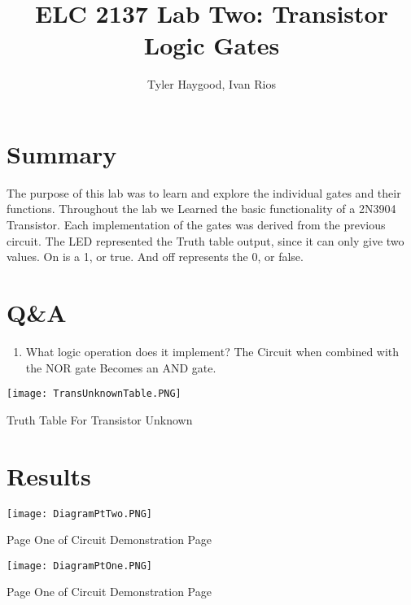 \documentclass[]{report}
\begin{document}
	
	\title{ELC 2137 Lab Two: Transistor Logic Gates}
	\author{Tyler Haygood, Ivan Rios}
	\maketitle
	
	\section*{Summary}
	
		The purpose of this lab was to learn and explore the individual gates and their functions. 
		Throughout the lab we Learned the basic functionality of a 2N3904 Transistor. Each implementation 
		of the gates was derived from the previous circuit. The LED represented the Truth table output, since it can only give two values.
		On is a 1, or true. And off represents the 0, or false.
		
	
	\section*{Q\&A}
	
		\begin{enumerate}
			\item What logic operation does it implement? \newline
			The Circuit when combined with the NOR gate Becomes an AND gate.		
		\end{enumerate}
		\centering
		\texttt{[image: TransUnknownTable.PNG]}
		\caption{Truth Table For Transistor Unknown}
		\label{fig:Trans_Unknown}
		
	\section*{Results}
	
		\centering
		\texttt{[image: DiagramPtTwo.PNG]}
		\caption{Page One of Circuit Demonstration Page}
		\label{fig:Page One of Demo Page}
		
		\texttt{[image: DiagramPtOne.PNG]}
		\caption{Page One of Circuit Demonstration Page}
		\label{fig:Page Two of Demo Page}
		
\end{document}
